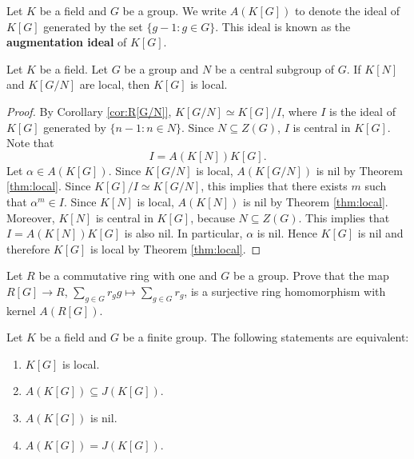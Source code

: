 Let $K$ be a field and $G$ be a group. We write $A(K[G])$ to denote
the ideal of $K[G]$ generated by the set $\{g-1:g\in G\}$. This ideal is known as the
\textbf{augmentation ideal} of $K[G]$. 

\begin{corollary}
\label{cor:local_K[N]_and_K[G/N]}
    Let $K$ be a field. 
    Let $G$ be a group and $N$ be a central subgroup of $G$. If $K[N]$ and $K[G/N]$ are local, 
    then $K[G]$ is local. 
\end{corollary}

\begin{proof}
    By Corollary \ref{cor:R[G/N]}, $K[G/N]\simeq K[G]/I$, where 
    $I$ is the ideal of $K[G]$ generated by $\{n-1:n\in N\}$. Since $N\subseteq Z(G)$, 
    $I$ is central in $K[G]$. Note that 
    \[
    I=A(K[N])K[G].
    \]
    Let $\alpha\in A(K[G])$. 
    Since $K[G/N]$ is local, $A(K[G/N])$ is nil by Theorem \ref{thm:local}. Since $K[G]/I\simeq K[G/N]$, this implies that 
    there exists $m$ such that $\alpha^m\in I$. Since $K[N]$ is local,  
    $A(K[N])$ is nil by Theorem \ref{thm:local}. Moreover, $K[N]$ is central in $K[G]$, because $N\subseteq Z(G)$. This implies that $I=A(K[N])K[G]$ is also nil. In particular, 
    $\alpha$ is nil. Hence 
    $K[G]$ is nil and therefore $K[G]$ is local by Theorem \ref{thm:local}. 
\end{proof}


\begin{exercise}
\label{xca:augmentation}
    Let $R$ be a commutative ring with one and $G$ be a group. 
    Prove that 
    the map $R[G]\to R$, $\sum_{g\in G}r_gg\mapsto\sum_{g\in G}r_g$, is a surjective
    ring homomorphism with kernel $A(R[G])$.  
\end{exercise}

\begin{lemma}
    Let $K$ be a field and $G$ be a finite group. 
    The following statements are equivalent: 
    \begin{enumerate}
        \item $K[G]$ is local. 
        \item $A(K[G])\subseteq J(K[G])$. 
        \item $A(K[G])$ is nil.
        \item $A(K[G])=J(K[G])$. 
    \end{enumerate}
\end{lemma}

